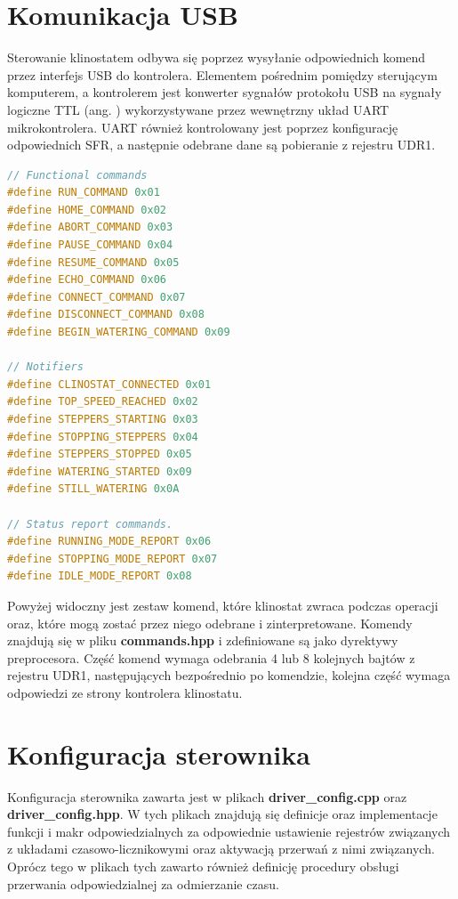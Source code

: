 \section{Komunikacja USB}

Sterowanie klinostatem odbywa się poprzez wysyłanie odpowiednich komend przez interfejs USB do kontrolera. Elementem pośrednim pomiędzy sterującym komputerem, a kontrolerem jest konwerter sygnałów protokołu USB na sygnały logiczne TTL (ang. ) wykorzystywane przez wewnętrzny układ UART mikrokontrolera. UART również kontrolowany jest poprzez konfigurację odpowiednich SFR, a następnie odebrane dane są pobieranie z rejestru UDR1.
\begin{lstlisting}[language=C++, caption=Plik \textbf{commands.hpp}.]
// Functional commands	
#define RUN_COMMAND 0x01
#define HOME_COMMAND 0x02
#define ABORT_COMMAND 0x03
#define PAUSE_COMMAND 0x04
#define RESUME_COMMAND 0x05
#define ECHO_COMMAND 0x06
#define CONNECT_COMMAND 0x07
#define DISCONNECT_COMMAND 0x08
#define BEGIN_WATERING_COMMAND 0x09

// Notifiers
#define CLINOSTAT_CONNECTED 0x01
#define TOP_SPEED_REACHED 0x02
#define STEPPERS_STARTING 0x03
#define STOPPING_STEPPERS 0x04
#define STEPPERS_STOPPED 0x05
#define WATERING_STARTED 0x09
#define STILL_WATERING 0x0A

// Status report commands.
#define RUNNING_MODE_REPORT 0x06
#define STOPPING_MODE_REPORT 0x07
#define IDLE_MODE_REPORT 0x08
\end{lstlisting}
Powyżej widoczny jest zestaw komend, które klinostat zwraca podczas operacji oraz, które mogą zostać przez niego odebrane i zinterpretowane. Komendy znajdują się w pliku \textbf{commands.hpp} i zdefiniowane są jako dyrektywy preprocesora. Część komend wymaga odebrania 4 lub 8 kolejnych bajtów z rejestru UDR1, następujących bezpośrednio po komendzie, kolejna część wymaga odpowiedzi ze strony kontrolera klinostatu.

\section{Konfiguracja sterownika}

Konfiguracja sterownika zawarta jest w plikach \textbf{driver\_config.cpp} oraz \textbf{driver\_config.hpp}. W tych plikach znajdują się definicje oraz implementacje funkcji i makr odpowiedzialnych za odpowiednie ustawienie rejestrów związanych z układami czasowo-licznikowymi oraz aktywacją przerwań z nimi związanych. Oprócz tego w plikach tych zawarto również definicję procedury obsługi przerwania odpowiedzialnej za odmierzanie czasu.

